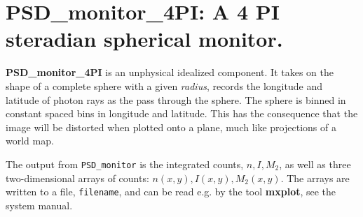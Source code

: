 \section{PSD\_monitor\_4PI: A 4 PI steradian spherical monitor.}

\textbf{PSD\_monitor\_4PI} is an unphysical idealized component. It takes on the shape of
a complete sphere with a given \textit{radius}, records the longitude and latitude of 
photon rays as the pass through the sphere.
The sphere is binned in constant spaced bins in longitude and latitude. This has the consequence
that the image will be distorted when plotted onto a plane, much like projections of a world map. 

The output from \texttt{PSD\_monitor} is the integrated counts, $n, I, M_2$,
as well as
three two-dimensional arrays of counts: $n(x,y), I(x,y), M_2(x,y)$.
The arrays are written to a file, \verb+filename+, and can be read e.g. by the tool
\textbf{mxplot}, see the system manual.

